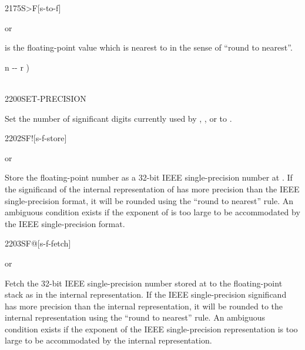 \begin{worddef}[StoF]{2175}{S>F}[s-to-f]%
\item {}  or 

	 is the floating-point value which is nearest to
	 in the sense of ``round to nearest''.


	\begin{implement} %
		\word{:}   n -{}- r ) \\
		\tab {}  \\
		\word{;}
	\end{implement}
\end{worddef}


\begin{worddef}{2200}{SET-PRECISION}
\item {}

	Set the number of significant digits currently used by ,
	, or  to .
\end{worddef}


\begin{worddef}{2202}{SF!}[s-f-store]
\item {}  or

	Store the floating-point number  as a 32-bit IEEE
	single-precision number at . If the significand
	of the internal representation of  has more precision
	than the IEEE single-precision format, it will be rounded using
	the ``round to nearest'' rule. An ambiguous condition exists if
	the exponent of  is too large to be accommodated by the
	IEEE single-precision format.

\end{worddef}


\begin{worddef}{2203}{SF@}[s-f-fetch]
\item {}  or

	Fetch the 32-bit IEEE single-precision number stored at
	 to the floating-point stack as  in the
	internal representation. If the IEEE single-precision
	significand has more precision than the internal representation,
	it will be rounded to the internal representation using the
	``round to nearest'' rule. An ambiguous condition exists if the
	exponent of the IEEE single-precision representation is too
	large to be accommodated by the internal representation.

\end{worddef}


